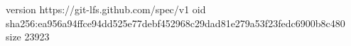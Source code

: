 version https://git-lfs.github.com/spec/v1
oid sha256:ea956a94ffce94dd525e77debf452968c29dad81e279a53f23fedc6900b8c480
size 23923
